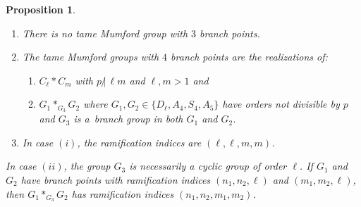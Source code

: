 \documentclass[pdftex]{sigma}
\numberwithin{equation}{section}
\newtheorem{Proposition}[Theorem]{Proposition}
\begin{document}
 \begin{Proposition} \label{5.3} \quad
\begin{enumerate}\itemsep=0pt
\item[$(1)$] There is no tame Mumford group with $3$ branch points.
\item[$(2)$] The tame Mumford groups with $4$ branch points are the realizations of:
\begin{enumerate}\itemsep=0pt
\item[$(i)$] $C_\ell \ast C_m$ with $p\,{\not |}\, \ell m$ and $\ell, m >1$ and
\item[$(ii)$] $G_1\ast _{G_3} G_2$ where $G_1,G_2\in \{D_\ell ,A_4,S_4,A_5\}$ have orders not divisible by $p$ and $G_3$ is a~branch group in both $G_1$ and $G_2$.
\end{enumerate}
\item[$(3)$] In case $(i)$, the ramification indices are $(\ell ,\ell , m,m)$.
\end{enumerate}
In case $(ii)$, the group $G_3$ is necessarily a cyclic group of order $\ell$. If $G_1$ and $G_2$ have branch points with ramification indices $(n_1,n_2,\ell)$ and $(m_1,m_2,\ell)$, then $G_1\ast_{G_3}G_2$ has ramification indices $(n_1,n_2,m_1,m_2)$.
\end{Proposition}
\end{document}
